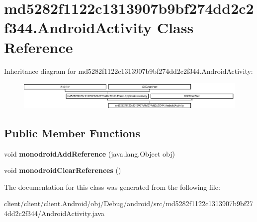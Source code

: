 \hypertarget{classmd5282f1122c1313907b9bf274dd2c2f344_1_1AndroidActivity}{}\section{md5282f1122c1313907b9bf274dd2c2f344.\+Android\+Activity Class Reference}
\label{classmd5282f1122c1313907b9bf274dd2c2f344_1_1AndroidActivity}
Inheritance diagram for md5282f1122c1313907b9bf274dd2c2f344.\+Android\+Activity\+:\begin{figure}[H]
\begin{center}
\leavevmode
\includegraphics[height=1.393035cm]{classmd5282f1122c1313907b9bf274dd2c2f344_1_1AndroidActivity}
\end{center}
\end{figure}
\subsection*{Public Member Functions}
\begin{DoxyCompactItemize}
\item 
\hypertarget{classmd5282f1122c1313907b9bf274dd2c2f344_1_1AndroidActivity_a1272b1697b15d644c0ee7c59a8c205f4}{}void {\bfseries monodroid\+Add\+Reference} (java.\+lang.\+Object obj)\label{classmd5282f1122c1313907b9bf274dd2c2f344_1_1AndroidActivity_a1272b1697b15d644c0ee7c59a8c205f4}

\item 
\hypertarget{classmd5282f1122c1313907b9bf274dd2c2f344_1_1AndroidActivity_a232b46242a169bd470297d53b67341db}{}void {\bfseries monodroid\+Clear\+References} ()\label{classmd5282f1122c1313907b9bf274dd2c2f344_1_1AndroidActivity_a232b46242a169bd470297d53b67341db}

\end{DoxyCompactItemize}


The documentation for this class was generated from the following file\+:\begin{DoxyCompactItemize}
\item 
client/client/client.\+Android/obj/\+Debug/android/src/md5282f1122c1313907b9bf274dd2c2f344/Android\+Activity.\+java\end{DoxyCompactItemize}
